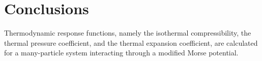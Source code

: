 \documentclass[12pt]{article}
\begin{document}
	\section{Conclusions}
	Thermodynamic response functions, namely the isothermal compressibility, the thermal pressure coefficient, and the thermal expansion coefficient, are calculated for a many-particle system interacting through a modified Morse potential.
	
	
\end{document}
